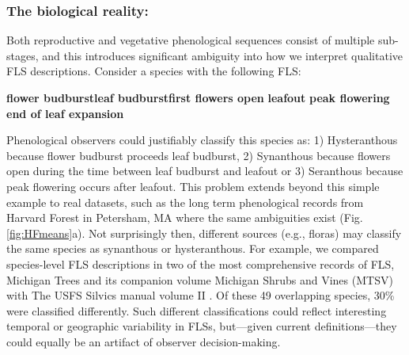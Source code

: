 \documentclass{article}
\begin{document}
\subsubsection*{The biological reality:}
 Both reproductive and vegetative phenological sequences consist of multiple sub-stages, and this introduces significant ambiguity into how we interpret qualitative FLS descriptions. Consider a species with the following FLS:\\
\begin{center}
\textbf{flower budburst}\rightarrow \textbf{leaf budburst}\rightarrow \textbf{first flowers open} \rightarrow \textbf{leafout} \rightarrow \textbf{peak flowering} \rightarrow \textbf{end of leaf expansion}\\
\end{center}
\noindent Phenological observers could justifiably classify this species as: 1) Hysteranthous because flower budburst proceeds leaf budburst, 2) Synanthous because flowers open during the time between leaf budburst and leafout or 3) Seranthous because peak flowering occurs after leafout. This problem extends beyond this simple example to real datasets, such as the long term phenological records from Harvard Forest in Petersham, MA \citep{OKeefe2015} where the same ambiguities exist (Fig. \ref{fig:HFmeans}a). Not surprisingly then, different sources (e.g., floras) may classify the same species as synanthous or hysteranthous. For example, we compared species-level FLS descriptions in two of the most comprehensive records of FLS, Michigan Trees and its companion volume Michigan Shrubs and Vines (MTSV) \citep{Barnes2004,Barnes2016} with The USFS Silvics manual volume II \citep{Burns1990}. Of these 49 overlapping species, 30\% were classified differently. Such different classifications could reflect interesting temporal or geographic variability in FLSs, but---given current definitions---they could equally be an artifact of observer decision-making.\\
\end{document}
